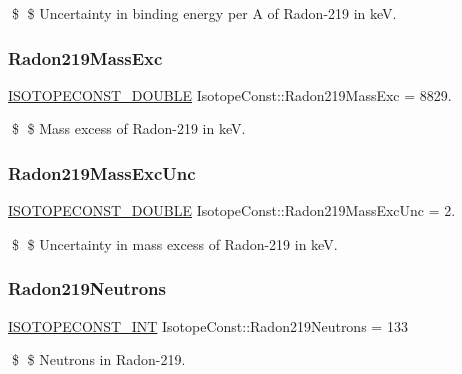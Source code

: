 \$ \$ Uncertainty in binding energy per A of Radon-\/219 in keV. \mbox{\label{group___isotope_const-_radon-_rn219_ga51fdf130e454a69f2fa58f3e4d3f9deb}} 
\subsubsection{\texorpdfstring{Radon219\+Mass\+Exc}{Radon219MassExc}}
{\footnotesize\ttfamily \mbox{\hyperlink{group___isotope_const-_macros_ga8f45a7272ce02c0b4c65c44636ed719a}{I\+S\+O\+T\+O\+P\+E\+C\+O\+N\+S\+T\+\_\+\+D\+O\+U\+B\+LE}} Isotope\+Const\+::\+Radon219\+Mass\+Exc = 8829.}

\$ \$ Mass excess of Radon-\/219 in keV. \mbox{\label{group___isotope_const-_radon-_rn219_gad1ede90f85bfe8c03f4387fe2718cf56}} 
\subsubsection{\texorpdfstring{Radon219\+Mass\+Exc\+Unc}{Radon219MassExcUnc}}
{\footnotesize\ttfamily \mbox{\hyperlink{group___isotope_const-_macros_ga8f45a7272ce02c0b4c65c44636ed719a}{I\+S\+O\+T\+O\+P\+E\+C\+O\+N\+S\+T\+\_\+\+D\+O\+U\+B\+LE}} Isotope\+Const\+::\+Radon219\+Mass\+Exc\+Unc = 2.}

\$ \$ Uncertainty in mass excess of Radon-\/219 in keV. \mbox{\label{group___isotope_const-_radon-_rn219_gab66bf49ab76f1f1e2b5cd6e517d03096}} 
\subsubsection{\texorpdfstring{Radon219\+Neutrons}{Radon219Neutrons}}
{\footnotesize\ttfamily \mbox{\hyperlink{group___isotope_const-_macros_ga5f18360b3e99483a35c32d789e62621c}{I\+S\+O\+T\+O\+P\+E\+C\+O\+N\+S\+T\+\_\+\+I\+NT}} Isotope\+Const\+::\+Radon219\+Neutrons = 133}

\$ \$ Neutrons in Radon-\/219. \mbox{\label{group___isotope_const-_radon-_rn219_ga9a3c82347744cb9fa3aeba702ea80d8e}} 
